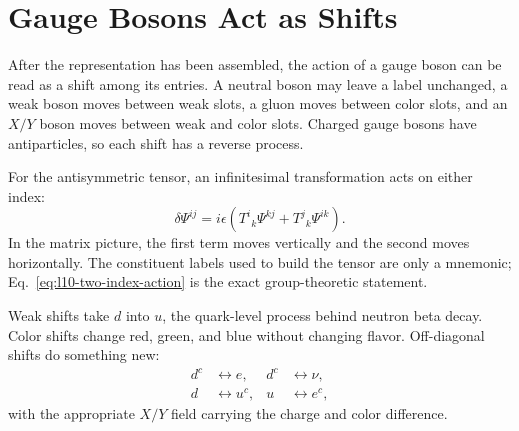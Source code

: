 \begin{classroomqa}
\end{classroomqa}

\section{Gauge Bosons Act as Shifts}

After the representation has been assembled, the action of a gauge boson can be read as a shift among its entries. A neutral boson may leave a label unchanged, a weak boson moves between weak slots, a gluon moves between color slots, and an \(X/Y\) boson moves between weak and color slots. Charged gauge bosons have antiparticles, so each shift has a reverse process.

For the antisymmetric tensor, an infinitesimal transformation acts on either index:
\begin{equation}
\delta\Psi^{ij}
=
i\epsilon
\left(
T^i{}_k\Psi^{kj}
+
T^j{}_k\Psi^{ik}
\right).
\label{eq:l10-two-index-action}
\end{equation}
In the matrix picture, the first term moves vertically and the second moves horizontally. The constituent labels used to build the tensor are only a mnemonic; Eq.~\eqref{eq:l10-two-index-action} is the exact group-theoretic statement.

Weak shifts take \(d\) into \(u\), the quark-level process behind neutron beta decay. Color shifts change red, green, and blue without changing flavor. Off-diagonal shifts do something new:
\begin{equation}
\begin{aligned}
d^c&\longleftrightarrow e,
& d^c&\longleftrightarrow\nu,\\
d&\longleftrightarrow u^c,
& u&\longleftrightarrow e^c,
\end{aligned}
\label{eq:l10-leptoquark-shifts}
\end{equation}
with the appropriate \(X/Y\) field carrying the charge and color difference.

\begin{classroomqa}
\end{classroomqa}

